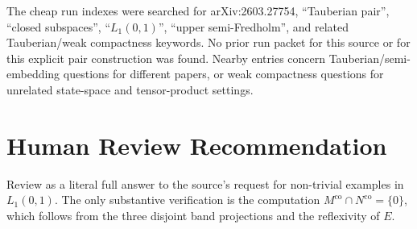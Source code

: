 \documentclass[11pt]{article}
\newcommand{\co}{\mathrm{co}}
\begin{document}
The cheap run indexes were searched for arXiv:2603.27754, ``Tauberian pair'',
``closed subspaces'', ``\(L_1(0,1)\)'', ``upper semi-Fredholm'', and related
Tauberian/weak compactness keywords.  No prior run packet for this source or
for this explicit pair construction was found.  Nearby entries concern
Tauberian/semi-embedding questions for different papers, or weak compactness
questions for unrelated state-space and tensor-product settings.

\section*{Human Review Recommendation}

Review as a literal full answer to the source's request for non-trivial
examples in \(L_1(0,1)\).  The only substantive verification is the computation
\(M^\co\cap N^\co=\{0\}\), which follows from the three disjoint band
projections and the reflexivity of \(E\).
\end{document}
